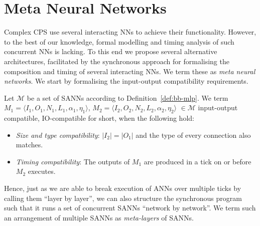 \section{Meta Neural Networks}
\label{sec:concurrent-sann}


Complex \ac{CPS} use several interacting \acp{NN} to achieve their
functionality. However, to the best of our knowledge, formal modelling
and timing analysis of such concurrent \acp{NN} is lacking. To this
end we propose several alternative architectures, facilitated by the
synchronous approach for formalising the composition and timing of
several interacting \acp{NN}. We term these as \emph{meta neural networks}.
We start by formalising the input-output compatibility requirements.

\begin{definition}
	\label{def:io-compatibility}
	Let $\mathcal{M}$ be a set of \acp{SANN} according to Definition~\ref{def:bb-mlp}.
	We term $M_1 = \langle I_1, O_1, N_1, L_1, \alpha_1, \eta_1 \rangle$, $M_2=\langle I_2, O_2, N_2, L_2, \alpha_2, \eta_2  \rangle$ 
	$\in \mathcal{M}$ input-output compatible,
	IO-compatible for short, when the following hold:
	\begin{itemize}
		\item \emph{Size and type compatibility}: $|I_2|=|O_1|$ and the type of every connection also matches.
		\item \emph{Timing compatibility}: The outputs of $M_1$ are produced in a tick on or before $M_2$
		executes.
	\end{itemize}
\end{definition} 

Hence, just as we are able to break execution of \acp{ANN} over
multiple ticks by calling them 
``layer by layer'', we can also structure the synchronous program such
that it runs a set of concurrent \acp{SANN} ``network by network''.  We term such an arrangement of 
multiple \acp{SANN} as \emph{meta-layers} of \acp{SANN}.

